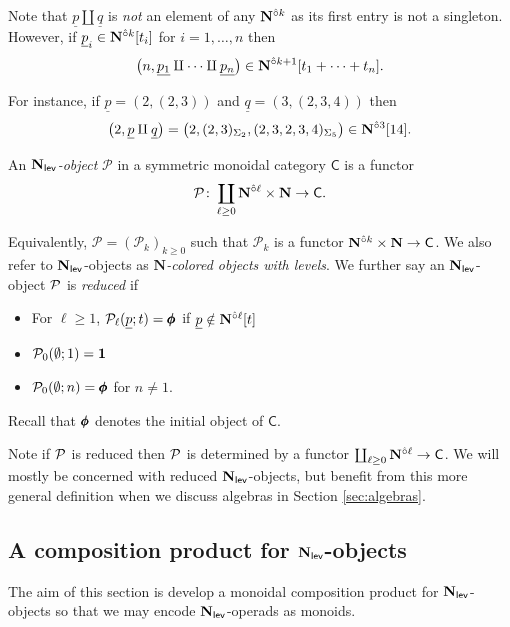 \begin{remark} Note that $\underline{p}\amalg \underline{q}$ is \textit{not} an element of any $\mathbf{N}^{\hat{\circ}k}$ as its first entry is not a singleton. However, if $\underline{p}_i\in \mathbf{N}^{\hat{\circ}k}[t_i]$ for $i=1,\dots,n$ then \[\big( n, \underline{p_1}\amalg\cdots \amalg \underline{p_n} \big)\in \mathbf{N}^{\hat{\circ}k+1}[t_1+\cdots+t_n].\]

For instance, if $\underline{p}=(2,(2,3))$ and $\underline{q}=(3,(2,3,4))$ then \[\big(2,\underline{p}\amalg\underline{q}\big)=\big(2,(2,3)_{\Sigma_2},(2,3,2,3,4)_{\Sigma_5}\big)\in \mathbf{N}^{\hat{\circ}3}[14].\] 
\end{remark}

\begin{definition} 
An \textit{$\mathbf{N}_{\mathsf{lev}}$-object} $\mathcal{P}$ in a symmetric monoidal category $\mathsf{C}$ is a functor \[ \mathcal{P}\colon \coprod_{\ell\geq 0} \mathbf{N}^{\hat{\circ}\ell}\times \mathbf{N} \to \mathsf{C}.\] 

Equivalently, $\mathcal{P}=(\mathcal{P}_{k})_{k\geq 0}$ such that $\mathcal{P}_{k}$ is a functor $\mathbf{N}^{\hat{\circ}k}\times \mathbf{N} \to \mathsf{C}$. We also refer to $\mathbf{N}_{\mathsf{lev}}$-objects as \textit{$\mathbf{N}$-colored objects with levels}. 
We further say an $\mathbf{N}_{\mathsf{lev}}$-object $\mathcal{P}$ is \textit{reduced} if \begin{itemize}
    \item For $\ell\geq 1$, $\mathcal{P}_{\ell}(\underline{p};t)= \pmb{\phi}$ if $\underline{p}\notin \mathbf{N}^{\hat{\circ}\ell}[t]$
    \item $\mathcal{P}_0(\emptyset;1)=\mathbf{1}$ 
    \item $\mathcal{P}_0(\emptyset; n)=\pmb{\phi}$ for $n\neq 1$. 
\end{itemize} 
Recall that $\pmb{\phi}$ denotes the initial object of $\mathsf{C}$.
\end{definition}
Note if $\mathcal{P}$ is reduced then $\mathcal{P}$ is determined by a functor $\coprod_{\ell\geq 0} \mathbf{N}^{\hat{\circ}\ell} \to \mathsf{C}$. We will mostly be concerned with reduced $\mathbf{N}_{\mathsf{lev}}$-objects, but benefit from this more general definition when we discuss algebras in Section \ref{sec:algebras}.

\subsection{A composition product for $\mathbf{N}_{\mathsf{lev}}$-objects}
The aim of this section is develop a monoidal composition product for $\mathbf{N}_{\mathsf{lev}}$-objects so that we may encode $\mathbf{N}_{\mathsf{lev}}$-operads as monoids. 

